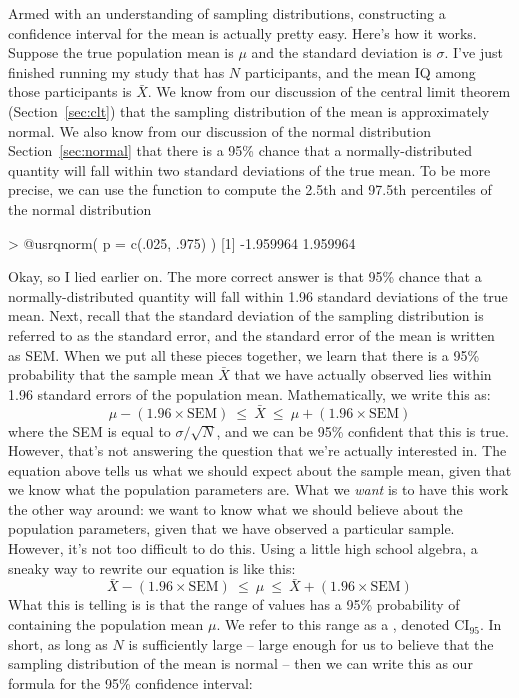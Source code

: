 Armed with an understanding of sampling distributions, constructing a confidence interval for the mean is actually pretty easy. Here's how it works. Suppose the true population mean is $\mu$ and the standard deviation is $\sigma$. I've just finished running my study that has $N$ participants, and the mean IQ among those participants is $\bar{X}$. We know from our discussion of the central limit theorem (Section~\ref{sec:clt}) that the sampling distribution of the mean is approximately normal. We also know from our discussion of the normal distribution Section~\ref{sec:normal} that there is a 95\% chance that a normally-distributed quantity will fall within two standard deviations of the true mean. To be more precise, we can use the  function to compute the 2.5th and 97.5th percentiles of the normal distribution
\begin{rblock1}
> @usr{qnorm( p = c(.025, .975) )}
[1] -1.959964  1.959964
\end{rblock1} 
Okay, so I lied earlier on. The more correct answer is that 95\% chance that a normally-distributed quantity will fall within 1.96 standard deviations of the true mean. Next, recall that the standard deviation of the sampling distribution is referred to as the standard error, and the standard error of the mean is written as SEM. When we put all these pieces together, we learn that there is a 95\% probability that the sample mean $\bar{X}$ that we have actually observed lies within 1.96 standard errors of the population mean. Mathematically, we write this as:
$$
\mu - \left( 1.96 \times \mbox{SEM} \right) \ \leq \  \bar{X}\  \leq \  \mu + \left( 1.96 \times \mbox{SEM} \right) 
$$
where the SEM is equal to $\sigma / \sqrt{N}$, and we can be 95\% confident that this is true. However, that's not answering the question that we're actually interested in. The equation above tells us what we should expect about the sample mean, given that we know what the population parameters are. What we {\it want} is to have this work the other way around: we want to know what we should believe about the population parameters, given that we have observed a particular sample. However, it's not too difficult to do this. Using a little high school algebra, a sneaky way to rewrite our equation is like this:
$$
\bar{X} -  \left( 1.96 \times \mbox{SEM} \right) \ \leq \ \mu  \ \leq  \ \bar{X} +  \left( 1.96 \times \mbox{SEM}\right)
$$
What this is telling is is that the range of values has a 95\% probability of containing the population mean $\mu$. We refer to this range as a , denoted $\mbox{CI}_{95}$. In short, as long as $N$ is sufficiently large  -- large enough for us to believe that the sampling distribution of the mean is normal -- then we can write this as our formula for the 95\% confidence interval:
